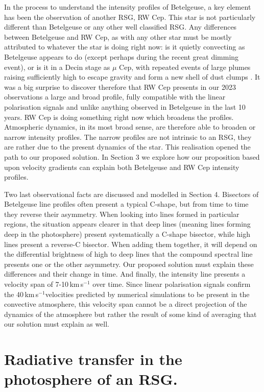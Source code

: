 \documentclass{/Users/art2/TeX/aanda/aa}
\def\kms {km\,s$^{-1}$}
\begin{document}
In the process to understand the intensity profiles of Betelgeuse, a key element has been the observation of another RSG, RW Cep. This star 
is not particularly different than Betelgeuse or any other well classified RSG. Any differences between Betelgeuse and RW Cep, as with any other star 
must be mostly attributed to whatever the star is doing right now: is it quietly convecting as Betelgeuse appears to do (except perhaps during 
the recent great dimming event), or is it in a Decin stage as $\mu$ Cep, with repeated events of large plumes raising sufficiently high to escape 
gravity and form a new shell of dust clumps \citep{lopez_ariste_height_2023,decin_probing_2006}. It was a big surprise to discover therefore that RW Cep presents in our 2023 observations a large and 
broad profile, fully compatible with the linear polarisation signals and unlike anything observed in Betelgeuse in the last 10 years. RW Cep is 
doing something right now which broadens the profiles. Atmospheric dynamics, in its most broad sense, are therefore able to broaden or narrow intensity 
profiles. The narrow profiles are not intrinsic to an RSG, they are rather due to the present dynamics of the star. This realisation opened the path 
to our proposed solution. In Section 3 we explore how our proposition based upon velocity gradients can explain both Betelgeuse and RW Cep intensity 
profiles.

Two last observational facts are discussed and modelled in Section 4. Bisectors of Betelgeuse line profiles often present a typical C-shape, but 
from time to time they reverse their asymmetry. When looking into lines formed in particular regions, the situation appears clearer in that deep 
lines (meaning lines forming deep in the photosphere) present systematically a C-shape bisector, while high lines present a reverse-C bisector. When
adding them together, it will depend on the differential brightness of high to deep lines that the compound spectral line presents one or the other asymmetry.
Our proposed solution must explain these differences and their change in time. And finally, the intensity line presents a velocity span of 7-10\,\kms 
over time. Since linear polarisation signals confirm the 40\,\kms velocities  predicted by numerical simulations to be present in the convective atmosphere, 
this  velocity span cannot be a direct projection of the dynamics of the atmosphere but rather the result of some kind of averaging that our solution 
must explain as well.




\section{Radiative transfer in the photosphere of an RSG.}
\end{document}
